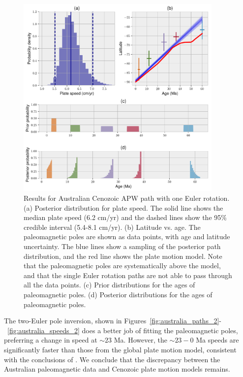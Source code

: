 \documentclass[preprint,12pt,authoryear]{elsarticle}
\begin{document}
\begin{figure}
\includegraphics[width=0.9\textwidth]{figures/australia/australia_speeds_1.pdf}
\caption[Results for Australian Cenozoic APW path with one Euler rotation.]{Results for Australian Cenozoic APW path with one Euler rotation. 
(a) Posterior distribution for plate speed. The solid line shows the median plate speed (6.2 cm/yr) and the dashed lines show the 95\% credible interval (5.4-8.1 cm/yr).
(b) Latitude vs. age. The paleomagnetic poles are shown as data points, with age and latitude uncertainty. The blue lines show a sampling of the posterior path distribution, and the red line shows the \citet{seton2012global} plate motion model. Note that the paleomagnetic poles are systematically above the \citet{seton2012global} model, and that the single Euler rotation paths are not able to pass through all the data points.
(c) Prior distributions for the ages of paleomagnetic poles.
(d) Posterior distributions for the ages of paleomagnetic poles.}
\label{fig:australia_speeds_1}
\end{figure}

The two-Euler pole inversion, shown in Figures~\ref{fig:australia_paths_2}-~\ref{fig:australia_speeds_2} does a better job of
fitting the paleomagnetic poles, preferring a change in speed at $\sim 23$ Ma.
However, the $\sim23-0$ Ma speeds are significantly faster than those from the global plate motion model,
consistent with the conclusions of \citet{idnurm1985lateII}.
We conclude that the discrepancy between the Australian paleomagnetic data and
Cenozoic plate motion models remains.
\end{document}
